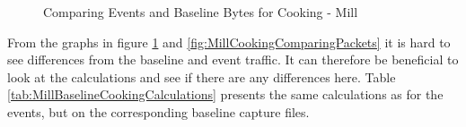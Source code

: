 \begin{figure}[H]
\begin{subfigure}[b]{0.47\textwidth}
    \end{subfigure}
        \begin{subfigure}[b]{0.47\textwidth}
        \centering
    \end{subfigure}
    \begin{subfigure}[b]{0.47\textwidth}
        \centering
    \end{subfigure}
    \begin{subfigure}[b]{0.47\textwidth}
        \centering
    \end{subfigure}
    \hspace{0.6cm}
    \begin{subfigure}[b]{0.47\textwidth}
    \centering
        \end{subfigure}
    \caption{Comparing Events and Baseline Bytes for Cooking - Mill}
    \label{fig:MillCookingComparingBytes}
\end{figure}

From the graphs in figure \ref{fig:MillCookingComparingBytes} and \ref{fig:MillCookingComparingPackets} it is hard to see differences from the baseline and event traffic. It can therefore be beneficial to look at the calculations and see if there are any differences here. Table \ref{tab:MillBaselineCookingCalculations} presents the same calculations as for the events, but on the corresponding baseline capture files. 

